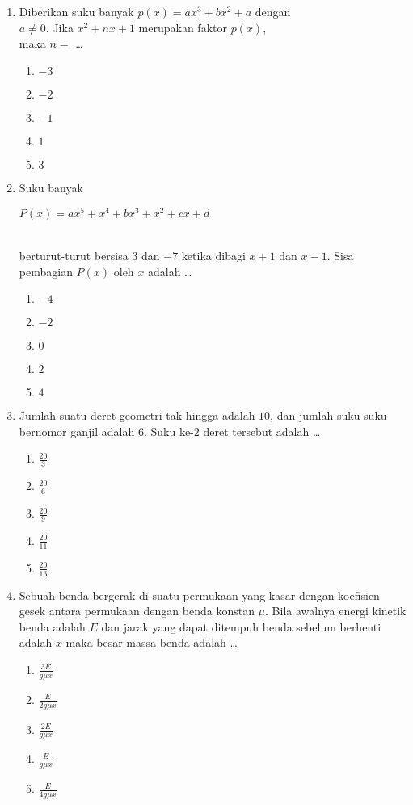 \documentclass[A4,12PT, english, twocolumn]{journal}
\begin{document}
\begin{enumerate}
\item Diberikan suku banyak $p \left(x \right) = ax^3+bx^2+a$ dengan \\ $a \neq 0$. Jika $x^2+nx+1$ merupakan faktor $p \left(x \right)$, \\ maka $n =$ \dots
    \begin{enumerate}
        \item $-3$
        \item $-2$
        \item $-1$
        \item $1$
        \item $3$
    \end{enumerate}

\item Suku banyak
\begin{center}
    $P \left(x \right) = ax^5+x^4+bx^3+x^2+cx+d$
\end{center} \\
berturut-turut bersisa $3$ dan $-7$ ketika dibagi $x+1$ dan $x-1$. Sisa pembagian $P \left(x \right)$ oleh $x$ adalah \dots
\begin{enumerate}
        \item $-4$
        \item $-2$
        \item $0$
        \item $2$
        \item $4$
    \end{enumerate}

\item Jumlah suatu deret geometri tak hingga adalah $10$, dan jumlah suku-suku bernomor ganjil adalah $6$. Suku ke-$2$ deret tersebut adalah \dots
    \begin{enumerate}
        \item $\frac{20}{3}$
        \item $\frac{20}{6}$
        \item $\frac{20}{9}$
        \item $\frac{20}{11}$
        \item $\frac{20}{13}$
    \end{enumerate}
    

\newpage
\item Sebuah benda bergerak di suatu permukaan yang kasar dengan koefisien gesek antara permukaan dengan benda konstan $\mu$. Bila awalnya energi kinetik benda adalah $E$ dan jarak yang dapat ditempuh benda sebelum berhenti adalah $x$ maka besar massa benda adalah \dots
    \begin{enumerate}
        \item $\frac{3E}{g \mu x}$
        \item $\frac{E}{2 g \mu x}$
        \item $\frac{2E}{g \mu x}$
        \item $\frac{E}{g \mu x}$
        \item $\frac{E}{4 g \mu x}$
    \end{enumerate}
  

\end{enumerate}
\end{document}
